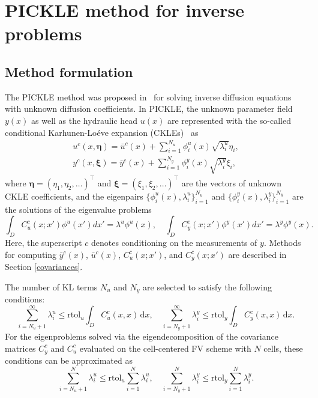 \documentclass{agujournal2019}
\begin{document}
\section{PICKLE method for inverse problems}
\label{sec:pickle}

\subsection{Method formulation}

The PICKLE method was proposed in~\cite{barajassolano-2019-pickle} for solving inverse diffusion equations with unknown diffusion coefficients.
In PICKLE, the unknown parameter field $y(x)$ as well as the hydraulic head $u(x)$ are represented with the so-called conditional Karhunen-Lo\'{e}ve expansion (CKLEs)~\citep{tipireddy-2020} as
%
\begin{gather}
  \label{eq:ckle_u}
  u^c(x, \boldsymbol{\eta}) = \bar{u}^c(x) + \sum_{i=1}^{N_u} \phi_i^u (x) \sqrt{\lambda_i^u} \eta_i,\\
  \label{eq:ckle_y}
  y^c(x, \boldsymbol{\xi}) = \bar{y}^c(x) + \sum_{i=1}^{N_y} \phi_i^y(x) \sqrt{\lambda_i^y} \xi_i,
\end{gather}
where $\boldsymbol{\eta} = (\eta_1, \eta_2, \ldots)^\top$ and $\boldsymbol{\xi} = (\xi_1, \xi_2, \ldots)^\top$ are the vectors of unknown CKLE coefficients, and the eigenpairs $\{\phi_i^u(x), \lambda_i^u\}_{i=1}^{N_u}$ and $\{\phi_i^y(x), \lambda_i^y\}_{i=1}^{N_y}$ are the solutions of the eigenvalue problems
%
\begin{equation}
  \label{eigenproblems}
  \int_D C^c_u(x; x')\phi^u(x') dx' = \lambda^u \phi^u(x), \quad
  \int_D C^c_y(x; x')\phi^y(x') dx' = \lambda^y\phi^y(x).
\end{equation}
%
Here, the superscript $c$ denotes conditioning on the measurements of $y$. Methods for computing $\bar{y}^c(x)$, $\bar{u}^c(x)$, $C^c_u(x; x')$, and $C^c_y(x; x')$ are described in Section \ref{covariances}.

The number of KL terms $N_u$ and $N_y$ are selected to satisfy the following conditions:
%
\begin{equation}
  \label{eq:truncation}
  \sum^{\infty}_{i = N_u + 1} \lambda_i^u \leq \text{rtol}_u \int_D  C^c_u(x,x) \, \mathrm{d} x, \quad \sum^{\infty}_{i = N_y + 1} \lambda_i^y \leq \text{rtol}_y \int_D C_y^c(x,x) \, \mathrm{d} x.
\end{equation}
%
For the eigenproblems solved via the eigendecomposition of the covariance matrices $C^c_y$ and $C^c_u$ evaluated on the cell-centered FV scheme with $N$ cells, these conditions can be approximated as
%
\begin{equation}
  \label{eq:truncation_disc}
  \sum^{N}_{i = N_u + 1} \lambda_i^u \leq \text{rtol}_u \sum^{N}_{i = 1} \lambda_i^u, \quad \sum^{N}_{i = N_y + 1} \lambda_i^y \leq \text{rtol}_y \sum^{N}_{i = 1} \lambda_i^y.
\end{equation}
\end{document}
